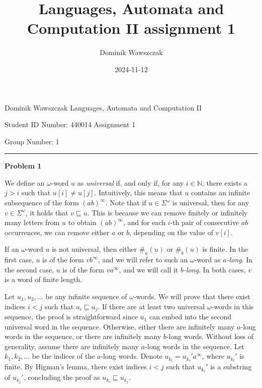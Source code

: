\documentclass[12pt]{article}
\title{Languages, Automata and Computation II assignment 1}
\author{Dominik Wawszczak}
\date{2024-11-12}
\begin{document}
	\setlength{\parindent}{0 cm}
	
	Dominik Wawszczak \hfill Languages, Automata and Computation II
	
	Student ID Number: 440014 \hfill Assignment 1
	
	Group Number: 1
	
	\bigskip
	\hrule
	\bigskip
	
	\textbf{Problem 1}
	
	\medskip
	
	We define an \(\omega\)-word \(u\) as \textit{universal} if, and only if,
	for any \(i \in \mathbb{N}\), there exists a \(j > i\) such that \(u[i] \neq
	u[j]\). Intuitively, this means that \(u\) contains an infinite subsequence
	of the form \((ab)^{\infty}\). Note that if \(u \in \Sigma^{\omega}\) is
	universal, then for any \(v \in \Sigma^{\omega}\), it holds that \(v
	\sqsubseteq u\). This is because we can remove finitely or infinitely many
	letters from \(u\) to obtain \((ab)^{\infty}\), and for each \(i\)-th pair
	of consecutive \(ab\) occurrences, we can remove either \(a\) or \(b\),
	depending on the value of \(v[i]\).
	
	\medskip
	
	If an \(\omega\)-word \(u\) is not universal, then either \(\#_{a}(u)\) or
	\(\#_{b}(u)\) is finite. In the first case, \(u\) is of the form
	\(vb^{\infty}\), and we will refer to such an \(\omega\)-word as
	\textit{\(a\)-long}. In the second case, \(u\) is of the form
	\(va^{\infty}\), and we will call it \textit{\(b\)-long}. In both cases,
	\(v\) is a word of finite length.
	
	\medskip
	
	Let \(u_{1}, u_{2}, \ldots\) be any infinite sequence of \(\omega\)-words.
	We will prove that there exist indices \(i < j\) such that \(u_{i}
	\sqsubseteq u_{j}\). If there are at least two universal \(\omega\)-words in
	this sequence, the proof is straightforward since \(u_{1}\) can embed into
	the second universal word in the sequence. Otherwise, either there are
	infinitely many \(a\)-long words in the sequence, or there are infinitely
	many \(b\)-long words. Without loss of generality, assume there are
	infinitely many \(a\)-long words in the sequence. Let \(k_{1}, k_{2},
	\ldots\) be the indices of the \(a\)-long words. Denote \(u_{k_{l}} =
	u_{k_{l}}'a^{\infty}\), where \(u_{k_{l}}'\) is finite. By Higman's lemma,
	there exist indices \(i < j\) such that \(u_{k_{i}}'\) is a substring of
	\(u_{k_{j}}'\), concluding the proof as \(u_{k_{i}} \sqsubseteq u_{k_{j}}\).
	
\end{document}
